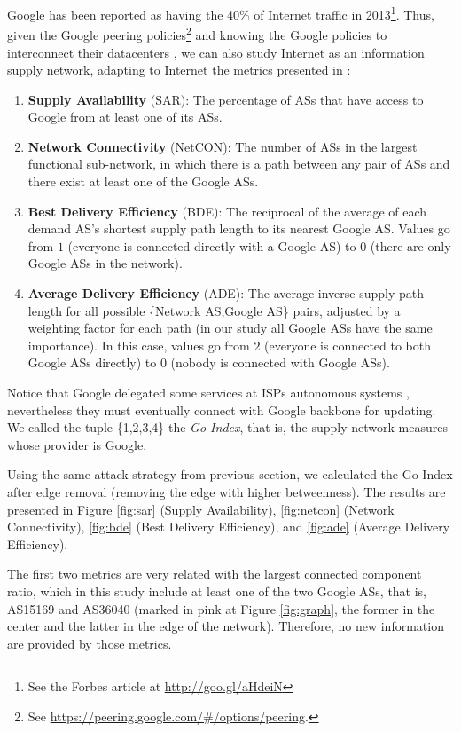 \documentclass{sig-alternate-10pt}
\begin{document}
Google has been reported as having the 40\% of Internet traffic in 2013\footnote{See the Forbes article at \url{http://goo.gl/aHdeiN}}. Thus, given the Google peering policies\footnote{See \url{https://peering.google.com/#/options/peering}.} and knowing the Google policies to interconnect their datacenters \cite{jain2013b4}, we can also study Internet as an information supply network, adapting to Internet the metrics presented in \cite{zhao2011achieving}:
\begin{enumerate}
\item \textbf{Supply Availability} (SAR): The percentage of ASs that have access to Google from at least one of its ASs.
\item \textbf{Network Connectivity} (NetCON): The number of ASs in the largest functional sub-network, in which there is a path between any pair of ASs and there exist at least one of the Google ASs.
\item \textbf{Best Delivery Efficiency} (BDE): The reciprocal of the average of each demand AS's shortest supply path length to its nearest Google AS.  Values go from $1$ (everyone is connected directly with a Google AS) to $0$ (there are only Google ASs in the network).
\item \textbf{Average Delivery Efficiency} (ADE): The average inverse supply path length for all possible \{Network AS,Google AS\} pairs, adjusted by a weighting factor for each path (in our study all Google ASs have the same importance). In this case, values go from $2$ (everyone is connected to both Google ASs directly) to $0$ (nobody is connected with Google ASs).
\end{enumerate}
Notice that Google delegated some services at ISPs autonomous systems \cite{calder2013mapping}, nevertheless they must eventually connect with  Google backbone for updating.  We called the tuple \{1,2,3,4\} the \textit{Go-Index}, that is, the supply network measures whose provider is Google. 

Using the same attack strategy from previous section, we calculated the Go-Index after edge removal (removing the edge with higher betweenness). The results are presented in Figure \ref{fig:sar} (Supply Availability), \ref{fig:netcon} (Network Connectivity), \ref{fig:bde} (Best Delivery Efficiency), and \ref{fig:ade} (Average Delivery Efficiency).  

The first two metrics are very related with the largest connected component ratio, which in this study include at least one of the two Google ASs, that is, AS15169 and AS36040 (marked in pink at Figure \ref{fig:graph}, the former in the center and the latter in the edge of the network).  Therefore, no new information are provided by those metrics.
\end{document}

